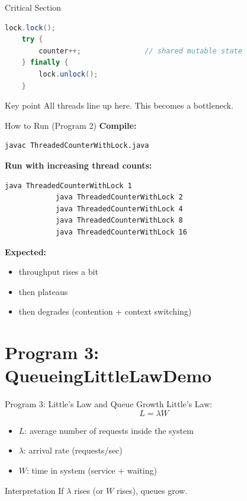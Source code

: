 \documentclass[11pt]{beamer}
\begin{document}
	\begin{frame}[fragile]{Critical Section}
		\begin{lstlisting}[language=Java]
	lock.lock();
	try {
		counter++;               // shared mutable state
	} finally {
		lock.unlock();
	}
		\end{lstlisting}

		
		\begin{alertblock}{Key point}
			All threads line up here. This becomes a bottleneck.
		\end{alertblock}
	\end{frame}
	
	\begin{frame}[fragile]{How to Run (Program 2)}
		\textbf{Compile:}
		\begin{lstlisting}[language=bash]
			javac ThreadedCounterWithLock.java
		\end{lstlisting}
		
		\pause
		
		\textbf{Run with increasing thread counts:}
		\begin{lstlisting}[language=bash]
			java ThreadedCounterWithLock 1
			java ThreadedCounterWithLock 2
			java ThreadedCounterWithLock 4
			java ThreadedCounterWithLock 8
			java ThreadedCounterWithLock 16
		\end{lstlisting}

		
		\textbf{Expected:}
		\begin{itemize}
			\item throughput rises a bit
			\item then plateaus
			\item then degrades (contention + context switching)
		\end{itemize}
	\end{frame}
	
	\section{Program 3: QueueingLittleLawDemo}
	
	\begin{frame}{Program 3: Little's Law and Queue Growth}
		Little's Law:
		\[
		L = \lambda W
		\]

		
		\begin{itemize}
			\item $L$: average number of requests inside the system
			\item $\lambda$: arrival rate (requests/sec)
			\item $W$: time in system (service + waiting)
		\end{itemize}

		
		\begin{alertblock}{Interpretation}
			If $\lambda$ rises (or $W$ rises), queues grow.
		\end{alertblock}
	\end{frame}
	
\end{document}
